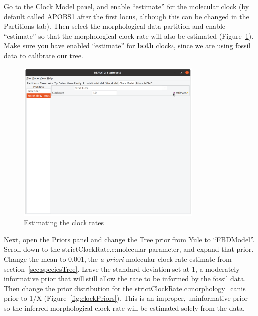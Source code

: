 \documentclass[12pt]{article}
\begin{document}
Go to the Clock Model panel, and enable ``estimate'' for the
molecular clock (by default called APOBS1 after the first locus, although
this can be changed in the Partitions tab). Then select the morphological
data partition and enable ``estimate'' so that the morphological
clock rate will also be estimated (Figure~\ref{fig:estimateMorphClock}).
Make sure you have enabled ``estimate'' for \textbf{both} clocks, since we
are using fossil data to calibrate our tree.

\begin{figure}[htb!]
\centering
\includegraphics[width=0.8\textwidth]{figures/estimateMorphClock.png}
\caption
{Estimating the clock rates}
\label{fig:estimateMorphClock}
\end{figure}

Next, open the Priors panel and change the Tree prior from Yule to
``FBDModel''. Scroll down to the strictClockRate.c:molecular parameter,
and expand that prior. Change the mean to 0.001, the \textit{a priori}
molecular clock rate estimate from section~\ref{sec:speciesTree}. Leave
the standard deviation set at 1, a moderately informative prior that will
still allow the rate to be informed by the fossil data. Then
change the prior distribution for the strictClockRate.c:morphology\_canis
prior to 1/X (Figure~\ref{fig:clockPriors}). This is an improper,
uninformative prior so the inferred morphological clock rate will be
estimated solely from the data.
\end{document}

